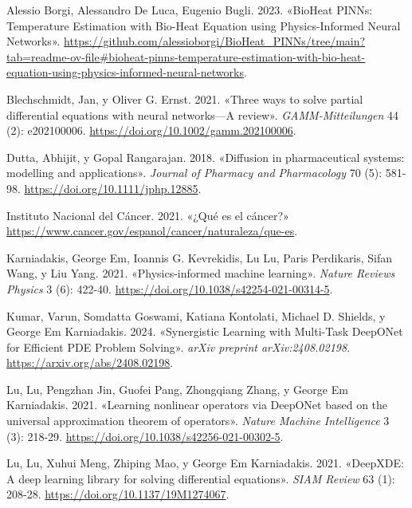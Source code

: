 \documentclass[
  spanish,
  us-letterpaper,
  DIV=11,
  numbers=noendperiod]{scrreprt}
\newlength{\cslhangindent}
\newenvironment{CSLReferences}[2] %
 {\begin{list}{}{%
  \setlength{\itemindent}{0pt}
  \setlength{\leftmargin}{0pt}
  \setlength{\parsep}{0pt}
  \ifodd #1
   \setlength{\leftmargin}{\cslhangindent}
   \setlength{\itemindent}{-1\cslhangindent}
  \fi
  \setlength{\itemsep}{#2\baselineskip}}}
 {\end{list}}
\begin{document}
\label{refs}
\begin{CSLReferences}{1}{0}
Alessio Borgi, Alessandro De Luca, Eugenio Bugli. 2023. {«{BioHeat
PINNs: Temperature Estimation with Bio-Heat Equation using
Physics-Informed Neural Networks}»}.
\url{https://github.com/alessioborgi/BioHeat_PINNs/tree/main?tab=readme-ov-file\#bioheat-pinns-temperature-estimation-with-bio-heat-equation-using-physics-informed-neural-networks}.

Blechschmidt, Jan, y Oliver G. Ernst. 2021. {«Three ways to solve
partial differential equations with neural networks---A review»}.
\emph{GAMM-Mitteilungen} 44 (2): e202100006.
\url{https://doi.org/10.1002/gamm.202100006}.

Dutta, Abhijit, y Gopal Rangarajan. 2018. {«Diffusion in pharmaceutical
systems: modelling and applications»}. \emph{Journal of Pharmacy and
Pharmacology} 70 (5): 581-98. \url{https://doi.org/10.1111/jphp.12885}.

Instituto Nacional del Cáncer. 2021. {«{¿Qué es el cáncer?}»}
\url{https://www.cancer.gov/espanol/cancer/naturaleza/que-es}.

Karniadakis, George Em, Ioannis G. Kevrekidis, Lu Lu, Paris Perdikaris,
Sifan Wang, y Liu Yang. 2021. {«Physics-informed machine learning»}.
\emph{Nature Reviews Physics} 3 (6): 422-40.
\url{https://doi.org/10.1038/s42254-021-00314-5}.

Kumar, Varun, Somdatta Goswami, Katiana Kontolati, Michael D. Shields, y
George Em Karniadakis. 2024. {«Synergistic Learning with Multi-Task
DeepONet for Efficient PDE Problem Solving»}. \emph{arXiv preprint
arXiv:2408.02198}. \url{https://arxiv.org/abs/2408.02198}.

Lu, Lu, Pengzhan Jin, Guofei Pang, Zhongqiang Zhang, y George Em
Karniadakis. 2021. {«Learning nonlinear operators via DeepONet based on
the universal approximation theorem of operators»}. \emph{Nature Machine
Intelligence} 3 (3): 218-29.
\url{https://doi.org/10.1038/s42256-021-00302-5}.

Lu, Lu, Xuhui Meng, Zhiping Mao, y George Em Karniadakis. 2021.
{«{DeepXDE}: A deep learning library for solving differential
equations»}. \emph{SIAM Review} 63 (1): 208-28.
\url{https://doi.org/10.1137/19M1274067}.


\end{CSLReferences}
\end{document}
